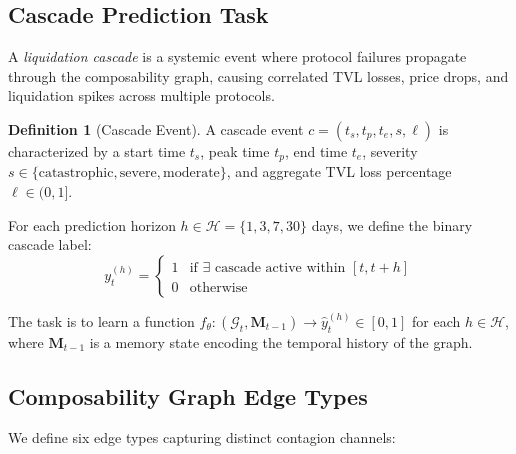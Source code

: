 \documentclass[journal]{IEEEtran}
\begin{document}
\subsection{Cascade Prediction Task}

A \emph{liquidation cascade} is a systemic event where protocol failures propagate through the composability graph, causing correlated TVL losses, price drops, and liquidation spikes across multiple protocols.

\textbf{Definition 1} (Cascade Event). A cascade event $c = (t_s, t_p, t_e, s, \ell)$ is characterized by a start time $t_s$, peak time $t_p$, end time $t_e$, severity $s \in \{\text{catastrophic}, \text{severe}, \text{moderate}\}$, and aggregate TVL loss percentage $\ell \in (0, 1]$.

For each prediction horizon $h \in \mathcal{H} = \{1, 3, 7, 30\}$ days, we define the binary cascade label:
\begin{equation}
    y_t^{(h)} = \begin{cases}
        1 & \text{if } \exists \text{ cascade active within } [t, t+h] \\
        0 & \text{otherwise}
    \end{cases}
\end{equation}

The task is to learn a function $f_\theta: (\mathcal{G}_t, \mathbf{M}_{t-1}) \rightarrow \hat{y}_t^{(h)} \in [0,1]$ for each $h \in \mathcal{H}$, where $\mathbf{M}_{t-1}$ is a memory state encoding the temporal history of the graph.

\subsection{Composability Graph Edge Types}

We define six edge types capturing distinct contagion channels:
\end{document}
